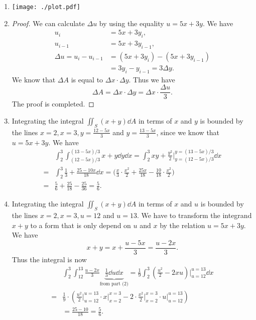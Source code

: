 \documentclass[8pt,twocolumn]{article}
\begin{document}
\begin{Answer}[number=14]
  \begin{enumerate}
    \item \texttt{[image: ./plot.pdf]}
    \item \begin{proof}
        We can calculate $\Delta u$ by using the equality $u=5x+3y$. We have
        \begin{align*}
          u_i &= 5x+3y_i,\\
          u_{i-1} &= 5x+3y_{i-1},\\
          \Delta u = u_i - u_{i-1} &= (5x+3y_i) - (5x+3y_{i-1}) \\
          &= 3y_i - y_{i-1} = 3\Delta y.
        \end{align*}
        We know that $\Delta A$ is equal to $\Delta x\cdot\Delta y$. Thus we
        have
        \[
          \Delta A = \Delta x\cdot \Delta y = \Delta x\cdot\frac{\Delta u}{3}.
        \]
        The proof is completed.
  \end{proof}
  \item Integrating the integral $\iint_S (x+y) \dd{A}$ in terms of $x$ and $y$
    is bounded by the lines $x=2, x=3, y=\frac{12-5x}{3}$ and
      $y=\frac{13-5x}{3}$, since we know that $u=5x+3y$. We have
      \begin{align*}
        &\int_2^3\int_{(12-5x)/3}^{(13-5x)/3} x+y \dd{y}\dd{x} =
        \int_2^3 xy+\frac{y^2}{2}\Big\vert_{y=(12-5x)/3}^{y=(13-5x)/3}\dd{x} \\
        =& \int_2^3 \frac{1}{3} + \frac{25-10x}{18}\dd{x} = \big( \frac{x}{3}
        \cdot \frac{x^2}{2} + \frac{25x}{18} - \frac{10}{18}\cdot\frac{x^2}{2}
        \big) \\
        =& \frac{5}{6} + \frac{25}{18} - \frac{25}{36} = \frac{5}{6}.
      \end{align*}
    \item Integrating the integral $\iint_S (x+y) \dd{A}$ in terms of $x$ and
      $u$ is bounded by the lines $x=2, x=3, u=12$ and $u=13$. We have to
      transform the integrand $x+y$ to a form that is only depend on $u$ and
      $x$ by the relation $u=5x+3y$. We have
      \[
        x+y = x + \frac{u-5x}{3} = \frac{u-2x}{3}.
      \]
      Thus the integral is now
      \begin{align*}
        &\int_2^3\int_{12}^{13}\frac{u-2x}{3}
        \underbrace{\frac{1}{3}\dd{u}\dd{x}}_\text{from part (2)} =
        \frac{1}{9}\int_2^3(\frac{u^2}{2}-2xu)\Big\vert_{u=12}^{u=13}\dd{x} \\
        =& \frac{1}{9} \cdot (\frac{u^2}{2}\vert_{u=12}^{u=13}\cdot
        x\vert_{x=2}^{x=3} -
        2\cdot \frac{x^2}{2}\vert_{x=2}^{x=3}\cdot u\vert_{u=12}^{u=13}) \\
        &= \frac{25-10}{18} = \frac{5}{6}.
      \end{align*}
  \end{enumerate}
\end{Answer}
\end{document}
